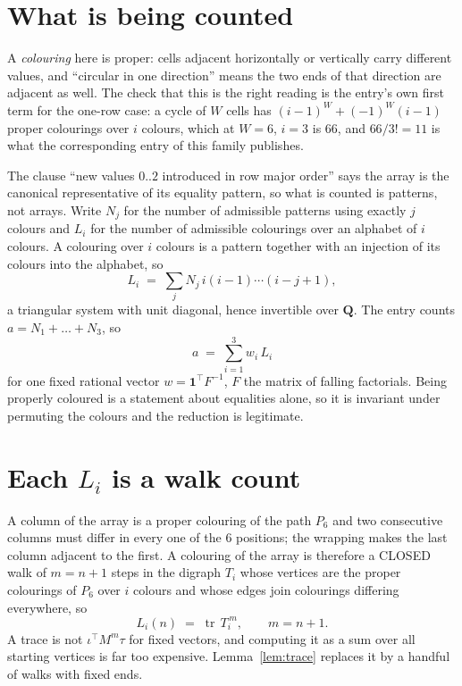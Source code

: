 \documentclass[11pt,a4paper]{article}
\theoremstyle{plain}
\theoremstyle{definition}
\begin{document}
\section{What is being counted}

A \emph{colouring} here is proper: cells adjacent horizontally or vertically carry different
values, and ``circular in one direction'' means the two ends of that direction are adjacent as
well. The check that this is the right reading is the entry's own first term for the
one-row case: a cycle of $W$ cells has $(i-1)^W+(-1)^W(i-1)$ proper colourings over $i$
colours, which at $W=6$, $i=3$ is $66$, and $66/3!=11$ is what the corresponding entry of this
family publishes.

The clause ``new values $0..2$ introduced in row major order'' says the array is the
canonical representative of its equality pattern, so what is counted is patterns, not arrays.
Write $N_j$ for the number of admissible patterns using exactly $j$ colours and $L_i$ for the
number of admissible colourings over an alphabet of $i$ colours. A colouring over $i$ colours
is a pattern together with an injection of its colours into the alphabet, so
\[
L_i\;=\;\sum_j N_j\,i(i-1)\cdots(i-j+1),
\]
a triangular system with unit diagonal, hence invertible over $\mathbf{Q}$. The entry counts
$a=N_1+\dots+N_{3}$, so
\[
a\;=\;\sum_{i=1}^{3}w_i\,L_i
\]
for one fixed rational vector $w=\mathbf{1}^{\!\top}F^{-1}$, $F$ the matrix of falling
factorials. Being properly coloured is a statement about equalities alone, so it is invariant
under permuting the colours and the reduction is legitimate.

\section{Each $L_i$ is a walk count}

A column of the array is a proper colouring of the path $P_{6}$ and two consecutive
columns must differ in every one of the $6$ positions; the wrapping makes the last column
adjacent to the first. A colouring of the array is therefore a CLOSED walk of $m=n+1$ steps
in the digraph $T_i$ whose vertices are the proper colourings of $P_{6}$ over $i$ colours
and whose edges join colourings differing everywhere, so
\[
L_i(n)\;=\;\operatorname{tr}\,T_i^{\,m},\qquad m=n+1.
\]
A trace is not $\iota^{\!\top}M^m\tau$ for fixed vectors, and computing it as a sum over all
starting vertices is far too expensive. Lemma~\ref{lem:trace} replaces it by a handful of
walks with fixed ends.
\end{document}
